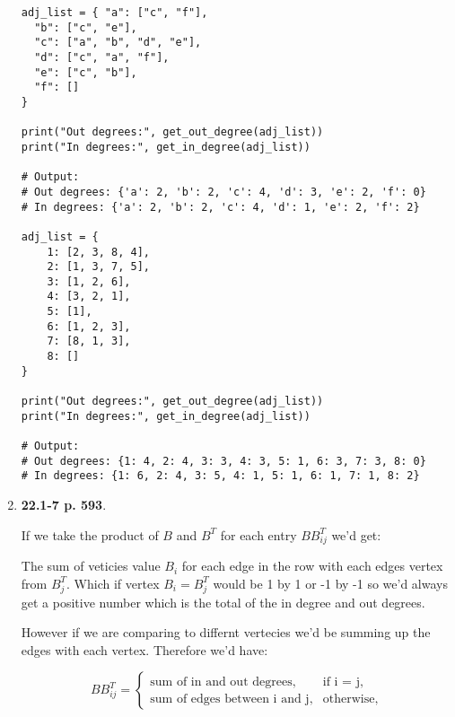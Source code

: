 \documentclass{article}
\begin{document}
\begin{enumerate}
    \begin{lstlisting}
adj_list = { "a": ["c", "f"],
  "b": ["c", "e"],
  "c": ["a", "b", "d", "e"],
  "d": ["c", "a", "f"],
  "e": ["c", "b"],
  "f": []
}

print("Out degrees:", get_out_degree(adj_list))
print("In degrees:", get_in_degree(adj_list))

# Output:
# Out degrees: {'a': 2, 'b': 2, 'c': 4, 'd': 3, 'e': 2, 'f': 0}
# In degrees: {'a': 2, 'b': 2, 'c': 4, 'd': 1, 'e': 2, 'f': 2}

adj_list = {
    1: [2, 3, 8, 4],
    2: [1, 3, 7, 5],
    3: [1, 2, 6],
    4: [3, 2, 1],
    5: [1],
    6: [1, 2, 3],
    7: [8, 1, 3],
    8: []
}

print("Out degrees:", get_out_degree(adj_list))
print("In degrees:", get_in_degree(adj_list))

# Output:
# Out degrees: {1: 4, 2: 4, 3: 3, 4: 3, 5: 1, 6: 3, 7: 3, 8: 0}
# In degrees: {1: 6, 2: 4, 3: 5, 4: 1, 5: 1, 6: 1, 7: 1, 8: 2}
    \end{lstlisting}

    \item \textbf{22.1-7 p. 593}.
    
    If we take the product of $B$ and $B^T$ for each entry $BB^{T}_{ij}$ we'd get:

    The sum of veticies value $B_i$ for each edge in the row with each edges vertex from $B^T_j$.
    Which if vertex $B_i = B^T_j$ would be 1 by 1 or -1 by -1 so we'd always get a positive number which is the total of the in degree and out degrees.

    However if we are comparing to differnt vertecies we'd be summing up the edges with each vertex. Therefore we'd have:

    \begin{equation}
      BB^T_{ij} =
      \begin{cases}
        \text{sum of in and out degrees,} & \text{if i = j,} \\
        \text{sum of edges between i and j,} & \text{otherwise,}
      \end{cases}
    \end{equation}

  \end{enumerate} %
\end{document}
